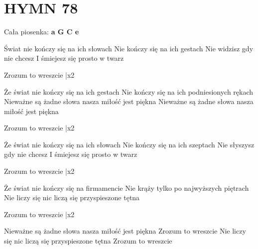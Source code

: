 \documentclass[../../../songbook.tex]{subfiles}
\begin{document}
\TabPositions{8cm} %
\section*{HYMN 78}
\vspace{0.5cm}
Cała piosenka: {\color{red}\textbf{a G C e } } \newline

Świat nie kończy się na ich słowach  \newline
Nie kończy się na ich gestach \newline
Nie widzisz gdy nie chcesz \newline
I śmiejesz się prosto w twarz \newline

\-\hspace{1cm} Zrozum to wreszcie  |x2 \newline

Że świat nie kończy się na ich gestach \newline
Nie kończy się na ich podniesionych rękach \newline
Nieważne są żadne słowa nasza miłość jest piękna \newline
Nieważne są żadne słowa nasza miłość jest piękna \newline

\-\hspace{1cm} Zrozum to wreszcie  |x2 \newline

Że świat nie kończy się na ich słowach  \newline
Nie kończy się na ich szeptach \newline
Nie słyszysz gdy nie chcesz  \newline
I śmiejesz się prosto w twarz  \newline

\-\hspace{1cm} Zrozum to wreszcie  |x2 \newline

Że świat nie kończy się na firmamencie  \newline
Nie krąży tylko po najwyższych piętrach  \newline
Nie liczy się nic liczą się przyspieszone tętna  \newline

\-\hspace{1cm} Zrozum to wreszcie  |x2 \newline

Nieważne są żadne słowa nasza miłość jest piękna \newline
Zrozum to wreszcie  \newline
Nie liczy się nic liczą się przyspieszone tętna \newline
Zrozum to wreszcie  \newline
\end{document}
